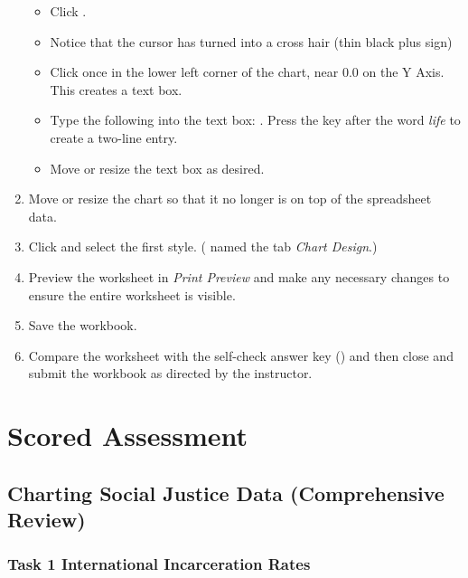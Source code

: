 \begin{enumbox}
\begin{enumerate}
		\begin{itemize}
			\item Click .
			\item Notice that the cursor has turned into a cross hair (thin black plus sign)
			\item Click once in the lower left corner of the chart, near $ 0.0 $ on the Y Axis. This creates a text box.
			\item Type the following into the text box: . Press the  key after the word \textit{life} to create a two-line entry. 
			\item Move or resize the text box as desired.
		\end{itemize}
		
		\item Move or resize the chart so that it no longer is on top of the spreadsheet data.
		\item Click  and select the first style. ( named the tab \textit{Chart Design}.)
		\item Preview the  worksheet in \textit{Print Preview} and make any necessary changes to ensure the entire worksheet is visible.
		\item Save the  workbook.
		\item Compare the worksheet with the self-check answer key () and then close and submit the  workbook as directed by the instructor.
		
	\end{enumerate}
\end{enumbox}
	
\section{Scored Assessment}

\subsection{Charting Social Justice Data (Comprehensive Review)}

\subsubsection{Task 1 International Incarceration Rates}

